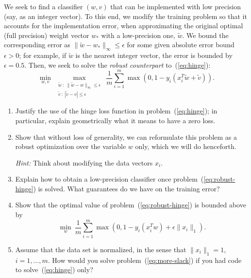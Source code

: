 \documentclass[11pt]{article}
\begin{document}
We seek to find a classifier $(w,v)$ that can be implemented with low precision (say, as an integer vector). To this end, we modify the training problem so that it accounts for the implementation error, when approximating the original optimal (full precision) weight vector $w_*$ with a low-precision one, $\tilde{w}$.  We bound the corresponding error as $\|\tilde{w}-w_*\|_\infty \le \epsilon$ for some given absolute error bound $\epsilon >0$; for example, if $\tilde{w}$ is the nearest integer vector, the error is bounded by $\epsilon = 0.5$. Then, we seek to solve the \emph{robust counterpart} to~(\ref{eq:hinge}):
\begin{equation}\label{eq:robust-hinge}
    \min_{w,v} \: \max_{\substack{\tilde{w} \::\: \|\tilde{w}-w\|_\infty \le \epsilon \\ \tilde{v} \::\: |\tilde{v}-v| \le \epsilon}} \: \frac{1}{m}
    \sum_{i=1}^m \max(0, 1-y_i(x_i^T\tilde{w} + \tilde{v}) ).
\end{equation}
\begin{enumerate}
    \item Justify the use of the hinge loss function in problem~(\ref{eq:hinge}); in particular, explain geometrically what it means to have a zero loss.

    \item Show that without loss of generality, we can reformulate this problem as a robust optimization over the variable $w$ only, which we will do henceforth.

    {\em Hint:} Think about modifying the data vectors $x_i$.

    \item Explain how to obtain a low-precision classifier once problem~(\ref{eq:robust-hinge}) is solved. What guarantees do we have on the training error?

    \item Show that the optimal value of problem~(\ref{eq:robust-hinge}) is bounded above by
\begin{equation}\label{eq:more-slack}
    \min_{w} \: \frac{1}{m}\sum_{i=1}^m \max(0, 1-y_i(x_i^Tw)+\epsilon \|x_i\|_1).
\end{equation}

\item Assume that the data set is normalized, in the sense that $\|x_i\|_1 = 1$, $i=1,\ldots,m$. How would you solve problem~(\ref{eq:more-slack}) if you had code to solve~(\ref{eq:hinge}) only?
\end{enumerate}
\end{document}
